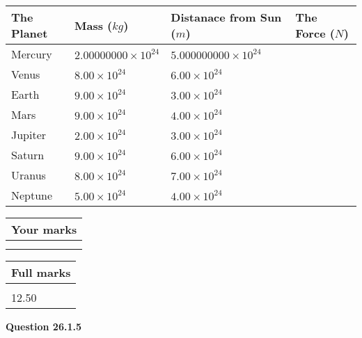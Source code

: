 \documentclass[12pt]{article}
\begin{document}
 
\begin{tabular}{|l|l|l|l|}
\hline
The Planet & Mass ($kg$) & Distanace from Sun ($m$) & The Force ($N$)\\
\hline
Mercury  &
           $ %
2.00000000 \times 10^{24} $   &
             $ %
5.000000000 \times 10^{24} $    &
\\  \hline
Venus    &
           $ %
8.00 \times 10^{24} $    &
             $ %
6.00 \times 10^{24} $    &
\\  \hline
Earth    &
           $ %
9.00 \times 10^{24} $    &
             $ %
3.00 \times 10^{24} $    &
\\   \hline
Mars     &
           $ %
9.00 \times 10^{24} $    &
             $ %
4.00 \times 10^{24} $    &
\\   \hline
Jupiter  &
           $ %
2.00 \times 10^{24} $    &
             $ %
3.00 \times 10^{24} $    &
\\  \hline
Saturn   &
           $ %
9.00 \times 10^{24}$    &
             $ %
6.00 \times 10^{24}$    &
\\  \hline
Uranus   &
           $ %
8.00 \times 10^{24} $    &
             $ %
7.00 \times 10^{24} $    &
\\  \hline
Neptune  &
           $ %
5.00 \times 10^{24} $    &
             $ %
4.00 \times 10^{24} $    &
\\  \hline
 
\end{tabular}
 
 

 
 

 
\vspace{0.3in}
  
\vspace{0.2in}
  
         \begin{tabular}{|l|}
\hline
 Your marks  \\
\hline
 \\ 
 \\ 
\hline
\end{tabular}
\hspace{0.05in} \begin{tabular}{|l|}
\hline
 Full marks  \\
\hline
 \\ 
12.50 \\
\hline
\end{tabular}
{\textbf{\Large{Question
26.1.5 
}}}
  
  
 
\end{document}
